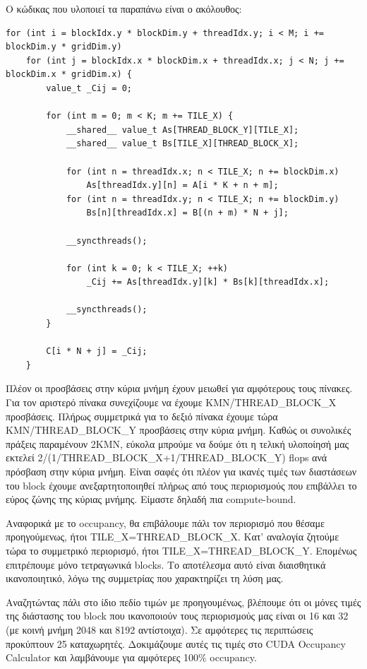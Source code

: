 \documentclass[titlepage]{article}
\begin{document}
Ο κώδικας που υλοποιεί τα παραπάνω είναι ο ακόλουθος:

\begin{verbatim}
for (int i = blockIdx.y * blockDim.y + threadIdx.y; i < M; i += blockDim.y * gridDim.y)
    for (int j = blockIdx.x * blockDim.x + threadIdx.x; j < N; j += blockDim.x * gridDim.x) {
        value_t _Cij = 0;

        for (int m = 0; m < K; m += TILE_X) {
            __shared__ value_t As[THREAD_BLOCK_Y][TILE_X];
            __shared__ value_t Bs[TILE_X][THREAD_BLOCK_X];

            for (int n = threadIdx.x; n < TILE_X; n += blockDim.x)
                As[threadIdx.y][n] = A[i * K + n + m];
            for (int n = threadIdx.y; n < TILE_X; n += blockDim.y)
                Bs[n][threadIdx.x] = B[(n + m) * N + j];

            __syncthreads();

            for (int k = 0; k < TILE_X; ++k)
                _Cij += As[threadIdx.y][k] * Bs[k][threadIdx.x];

            __syncthreads();
        }

        C[i * N + j] = _Cij;
    }
\end{verbatim}

Πλέον οι προσβάσεις στην κύρια μνήμη έχουν μειωθεί για αμφότερους τους πίνακες. Για τον αριστερό πίνακα συνεχίζουμε να έχουμε KMN/THREAD\_BLOCK\_X προσβάσεις. Πλήρως συμμετρικά για το δεξιό πίνακα έχουμε τώρα KMN/THREAD\_BLOCK\_Y προσβάσεις στην κύρια μνήμη. Καθώς οι συνολικές πράξεις παραμένουν 2KMN, εύκολα μπρούμε να δούμε ότι η τελική υλοποίησή μας εκτελεί 2/(1/THREAD\_BLOCK\_X+1/THREAD\_BLOCK\_Y) flops ανά πρόσβαση στην κύρια μνήμη. Είναι σαφές ότι πλέον για ικανές τιμές των διαστάσεων του block έχουμε ανεξαρτητοποιηθεί πλήρως από τους περιορισμούς που επιβάλλει το εύρος ζώνης της κύριας μνήμης. Είμαστε δηλαδή πια compute-bound.

Αναφορικά με το occupancy, θα επιβάλουμε πάλι τον περιορισμό που θέσαμε προηγούμενως, ήτοι TILE\_X=THREAD\_BLOCK\_X. Κατ' αναλογία ζητούμε τώρα το συμμετρικό περιορισμό, ήτοι TILE\_X=THREAD\_BLOCK\_Y. Επομένως επιτρέπουμε μόνο τετραγωνικά blocks. Το αποτέλεσμα αυτό είναι διαισθητικά ικανοποιητικό, λόγω της συμμετρίας που χαρακτηρίζει τη λύση μας.

Αναζητώντας πάλι στο ίδιο πεδίο τιμών με προηγουμένως, βλέπουμε ότι οι μόνες τιμές της διάστασης του block που ικανοποιούν τους περιορισμούς μας είναι οι 16 και 32 (με κοινή μνήμη 2048 και 8192 αντίστοιχα). Σε αμφότερες τις περιπτώσεις προκύπτουν 25 καταχωρητές. Δοκιμάζουμε αυτές τις τιμές στο CUDA Occupancy Calculator και λαμβάνουμε για αμφότερες 100\% occupancy.
\end{document}
